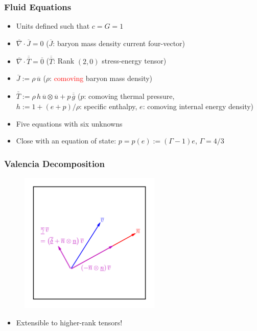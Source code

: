 \documentclass{beamer}
\newcommand{\red}{\textcolor{red}}
\newcommand{\ol}{\overline}
\begin{document}
\begin{frame}
\frametitle{Fluid Equations}

  \begin{itemize}[<+->]
    \item[]
      Units defined such that $c=G=1$\\[1em]
    \item[]
      $\ol{\nabla}\cdot\ol{J}=0$\hspace{1em}
      ($\ol{J}$: baryon mass density current four-vector)
    \item[]
      $\ol{\nabla}\cdot\ol{\ol{T}}=\ol{0}$\hspace{1em}
      ($\ol{\ol{T}}$: Rank $\left(2,0\right)$ stress-energy tensor)\\[1em]
    \item[]
      $\ol{J}:=\rho\,\ol{u}$\hspace{1em}
      ($\rho$: \red{comoving} baryon mass density)\\[1em]
    \item[]
      $\ol{\ol{T}}:=\rho\,h\,\ol{u}\otimes\ol{u}+p\,\ol{\ol{g}}$\hspace{1em}
      ($p$: comoving thermal pressure,\\[0.5em]
      $h:=1+\left(e+p\right)/\rho$: specific enthalpy,
      $e$: comoving internal energy density)\\[1em]
    \item[]
      Five equations with six unknowns \frownie{}\\[1em]
    \item[]
      Close with an equation of state:
      $p=p\left(e\right):=\left(\Gamma-1\right)e$,
      $\Gamma=4/3$
  \end{itemize}

\end{frame}

\begin{frame}
\frametitle{Valencia Decomposition}

  \begin{figure}[htb!]
    \centering
    \includegraphics[width=0.6\textwidth]{fig.decomp.png}
  \end{figure}

  \begin{itemize}[<+->]
    \item[]
     Extensible to higher-rank tensors!
  \end{itemize}

\end{frame}
\end{document}
